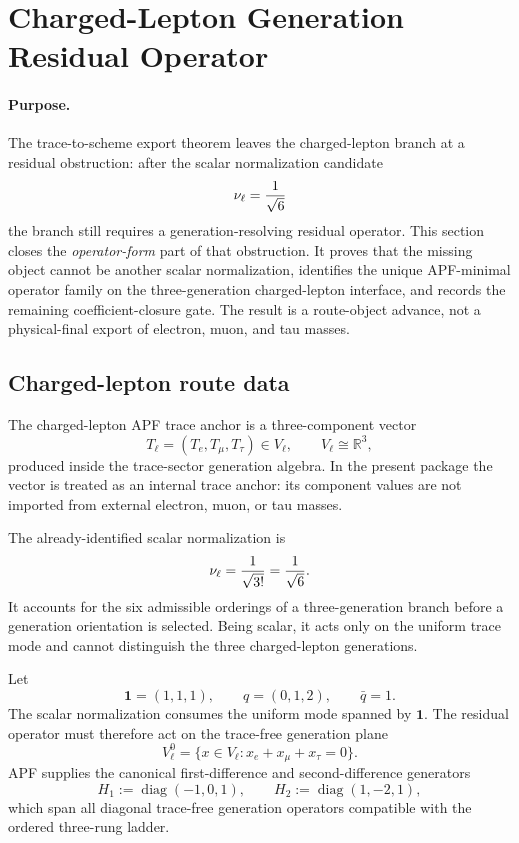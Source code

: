 \section{Charged-Lepton Generation Residual Operator}
\label{sec:charged-lepton-residual-operator-v38}

\paragraph{Purpose.}
The trace-to-scheme export theorem leaves the charged-lepton branch at a residual obstruction: after the scalar normalization candidate
\[
        \nu_\ell={1\over\sqrt 6}
\]
the branch still requires a generation-resolving residual operator.  This section closes the \emph{operator-form} part of that obstruction.  It proves that the missing object cannot be another scalar normalization, identifies the unique APF-minimal operator family on the three-generation charged-lepton interface, and records the remaining coefficient-closure gate.  The result is a route-object advance, not a physical-final export of electron, muon, and tau masses.

\subsection{Charged-lepton route data}

\begin{definition}
The charged-lepton APF trace anchor is a three-component vector
\[
        T_\ell=(T_e,T_\mu,T_\tau)\in V_\ell,
        \qquad V_\ell\cong\mathbb R^3,
\]
produced inside the trace-sector generation algebra.  In the present package the vector is treated as an internal trace anchor: its component values are not imported from external electron, muon, or tau masses.
\end{definition}

\begin{definition}
The already-identified scalar normalization is
\[
        \nu_\ell={1\over\sqrt{3!}}={1\over\sqrt 6}.
\]
It accounts for the six admissible orderings of a three-generation branch before a generation orientation is selected.  Being scalar, it acts only on the uniform trace mode and cannot distinguish the three charged-lepton generations.
\end{definition}

\begin{definition}
Let
\[
        \mathbf 1=(1,1,1),\qquad q=(0,1,2),\qquad \bar q=1.
\]
The scalar normalization consumes the uniform mode spanned by \(\mathbf 1\).  The residual operator must therefore act on the trace-free generation plane
\[
        V_\ell^0=\{x\in V_\ell: x_e+x_\mu+x_\tau=0\}.
\]
APF supplies the canonical first-difference and second-difference generators
\[
        H_1:=\operatorname{diag}(-1,0,1),
        \qquad
        H_2:=\operatorname{diag}(1,-2,1),
\]
which span all diagonal trace-free generation operators compatible with the ordered three-rung ladder.
\end{definition}

